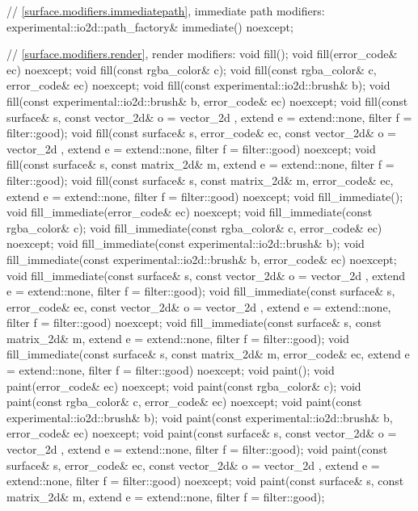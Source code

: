 \begin{codeblock}
{{{{{    // \ref{surface.modifiers.immediatepath}, immediate path modifiers:
    experimental::io2d::path_factory& immediate() noexcept;

    // \ref{surface.modifiers.render}, render modifiers:
    void fill();
    void fill(error_code& ec) noexcept;
    void fill(const rgba_color& c);
    void fill(const rgba_color& c, error_code& ec) noexcept;
    void fill(const experimental::io2d::brush& b);
    void fill(const experimental::io2d::brush& b, error_code& ec) noexcept;
    void fill(const surface& s, const vector_2d& o = vector_2d{ },
      extend e = extend::none, filter f = filter::good);
    void fill(const surface& s, error_code& ec,
      const vector_2d& o = vector_2d{ }, extend e = extend::none,
      filter f = filter::good) noexcept;
    void fill(const surface& s, const matrix_2d& m, extend e = extend::none,
      filter f = filter::good);
    void fill(const surface& s, const matrix_2d& m, error_code& ec,
      extend e = extend::none, filter f = filter::good) noexcept;
    void fill_immediate();
    void fill_immediate(error_code& ec) noexcept;
    void fill_immediate(const rgba_color& c);
    void fill_immediate(const rgba_color& c, error_code& ec) noexcept;
    void fill_immediate(const experimental::io2d::brush& b);
    void fill_immediate(const experimental::io2d::brush& b, error_code& ec)
      noexcept;
    void fill_immediate(const surface& s, const vector_2d& o = vector_2d{ }, 
      extend e = extend::none, filter f = filter::good);
    void fill_immediate(const surface& s, error_code& ec,
      const vector_2d& o = vector_2d{ }, extend e = extend::none,
      filter f = filter::good) noexcept;
    void fill_immediate(const surface& s, const matrix_2d& m,
      extend e = extend::none, filter f = filter::good);
    void fill_immediate(const surface& s, const matrix_2d& m, error_code& ec,
      extend e = extend::none, filter f = filter::good) noexcept;
    void paint();
    void paint(error_code& ec) noexcept;
    void paint(const rgba_color& c);
    void paint(const rgba_color& c, error_code& ec) noexcept;
    void paint(const experimental::io2d::brush& b);
    void paint(const experimental::io2d::brush& b, error_code& ec) noexcept;
    void paint(const surface& s, const vector_2d& o = vector_2d{ },
      extend e = extend::none, filter f = filter::good);
    void paint(const surface& s, error_code& ec,
      const vector_2d& o = vector_2d{ }, extend e = extend::none,
      filter f = filter::good) noexcept;
    void paint(const surface& s, const matrix_2d& m, extend e = extend::none,
      filter f = filter::good);
}}}}}
\end{codeblock}
